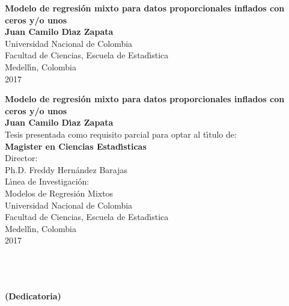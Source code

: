 \begin{center}
\begin{figure}
\centering%
%
\end{figure}
\thispagestyle{empty} \vspace*{2.0cm} \textbf{\huge
Modelo de regresi\'{o}n mixto para datos proporcionales inflados con ceros y/o unos}\\[5.5cm]
\Large\textbf{Juan Camilo D\'{\i}az Zapata}\\[5.5cm]
\small Universidad Nacional de Colombia\\
Facultad de Ciencias, Escuela de Estad\'{\i}stica\\
Medell\'{\i}n, Colombia\\
2017\\
\end{center}

\newpage{\pagestyle{empty}\cleardoublepage}

\newpage
\begin{center}
\thispagestyle{empty} \vspace*{0cm} \textbf{\huge
Modelo de regresi\'{o}n mixto para datos proporcionales inflados con ceros y/o unos}\\[3.0cm]
\Large\textbf{Juan Camilo D\'{\i}az Zapata}\\[3.0cm]
\small Tesis presentada como requisito parcial para optar al
t\'{\i}tulo de:\\
\textbf{Magister en Ciencias Estad\'{\i}sticas}\\[2.5cm]
Director:\\
Ph.D. Freddy Hern\'{a}ndez Barajas\\[2.0cm]
L\'{\i}nea de Investigaci\'{o}n:\\
Modelos de Regresi\'{o}n Mixtos\\[2.5cm]
Universidad Nacional de Colombia\\
Facultad de Ciencias, Escuela de Estad\'{\i}stica\\
Medell\'{\i}n, Colombia\\
2017\\
\end{center}

\newpage{\pagestyle{empty}\cleardoublepage}

\newpage
\thispagestyle{empty} \textbf{}\normalsize
\\\\\\%
\textbf{(Dedicatoria)}\\[4.0cm]

